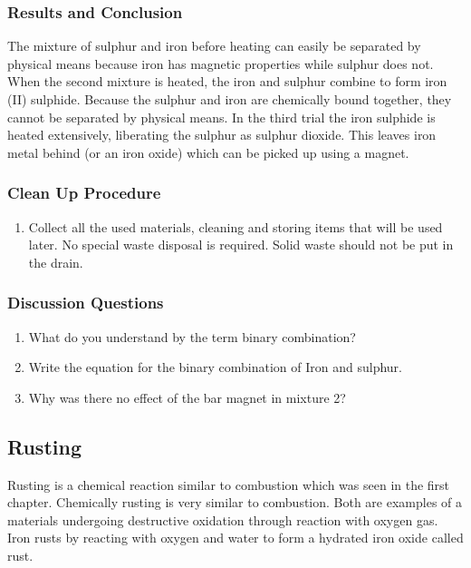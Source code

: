 \subsubsection*{Results and Conclusion}
The mixture of sulphur and iron before heating can easily be separated by physical means because iron has magnetic properties while sulphur does not. When the second mixture is heated, the iron and sulphur combine to form iron (II) sulphide. Because the sulphur and iron are chemically bound together, they cannot be separated by physical means. In the third trial the iron sulphide is heated extensively, liberating the sulphur as sulphur dioxide. This leaves iron metal behind (or an iron oxide) which can be picked up using a magnet.

\subsubsection*{Clean Up Procedure}
\begin{enumerate}
\item{Collect all the used materials, cleaning and storing items that will be used later. No special waste disposal is required. Solid waste should not be put in the drain.}
\end{enumerate}

\subsubsection*{Discussion Questions}
\begin{enumerate}
\item{What do you understand by the term binary combination?}
\item{Write the equation for the binary combination of Iron and sulphur.}
\item{Why was there no effect of the bar magnet in mixture 2?}
\end{enumerate}

\subsection{Rusting}

Rusting is a chemical reaction similar to combustion which was seen in the first chapter. Chemically rusting is very similar to combustion. Both are examples of a materials undergoing destructive oxidation through reaction with oxygen gas. Iron rusts by reacting with oxygen and water to form a hydrated iron oxide called rust.

